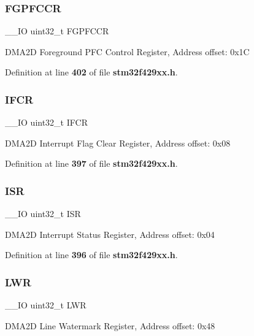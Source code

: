\subsubsection{F\+G\+P\+F\+C\+CR}
{\footnotesize\ttfamily \+\_\+\+\_\+\+IO uint32\+\_\+t F\+G\+P\+F\+C\+CR}

D\+M\+A2D Foreground P\+FC Control Register, Address offset\+: 0x1C 

Definition at line \textbf{ 402} of file \textbf{ stm32f429xx.\+h}.

\mbox{\label{structDMA2D__TypeDef_ac6f9d540fd6a21c0fbc7bfbbee9a8504}} 
\subsubsection{I\+F\+CR}
{\footnotesize\ttfamily \+\_\+\+\_\+\+IO uint32\+\_\+t I\+F\+CR}

D\+M\+A2D Interrupt Flag Clear Register, Address offset\+: 0x08 

Definition at line \textbf{ 397} of file \textbf{ stm32f429xx.\+h}.

\mbox{\label{structDMA2D__TypeDef_ab3c49a96815fcbee63d95e1e74f20e75}} 
\subsubsection{I\+SR}
{\footnotesize\ttfamily \+\_\+\+\_\+\+IO uint32\+\_\+t I\+SR}

D\+M\+A2D Interrupt Status Register, Address offset\+: 0x04 

Definition at line \textbf{ 396} of file \textbf{ stm32f429xx.\+h}.

\mbox{\label{structDMA2D__TypeDef_a2fc2e30027d62fbf2ad32f911fbadeca}} 
\subsubsection{L\+WR}
{\footnotesize\ttfamily \+\_\+\+\_\+\+IO uint32\+\_\+t L\+WR}

D\+M\+A2D Line Watermark Register, Address offset\+: 0x48 

